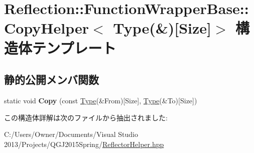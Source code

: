 \hypertarget{struct_reflection_1_1_function_wrapper_base_1_1_copy_helper_3_01_type_07_6_08[_size]_4}{}\section{Reflection\+:\+:Function\+Wrapper\+Base\+:\+:Copy\+Helper$<$ Type(\&)\mbox{[}Size\mbox{]}$>$ 構造体テンプレート}
\label{struct_reflection_1_1_function_wrapper_base_1_1_copy_helper_3_01_type_07_6_08[_size]_4}
\subsection*{静的公開メンバ関数}
\begin{DoxyCompactItemize}
\item 
static void {\bfseries Copy} (const \hyperlink{class_reflection_1_1_type}{Type}(\&From)\mbox{[}Size\mbox{]}, \hyperlink{class_reflection_1_1_type}{Type}(\&To)\mbox{[}Size\mbox{]})\hypertarget{struct_reflection_1_1_function_wrapper_base_1_1_copy_helper_3_01_type_07_6_08[_size]_4_a34cc2e8b13500fb370bad6f48c585df4}{}\label{struct_reflection_1_1_function_wrapper_base_1_1_copy_helper_3_01_type_07_6_08[_size]_4_a34cc2e8b13500fb370bad6f48c585df4}

\end{DoxyCompactItemize}


この構造体詳解は次のファイルから抽出されました\+:\begin{DoxyCompactItemize}
\item 
C\+:/\+Users/\+Owner/\+Documents/\+Visual Studio 2013/\+Projects/\+Q\+G\+J2015\+Spring/\hyperlink{_reflector_helper_8hpp}{Reflector\+Helper.\+hpp}\end{DoxyCompactItemize}
